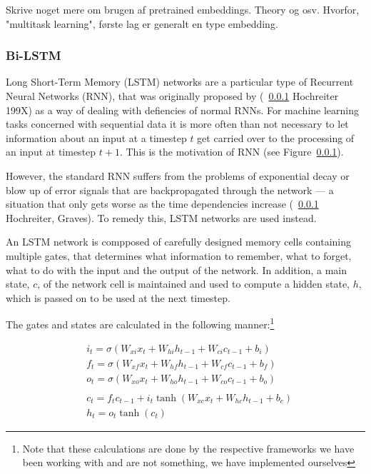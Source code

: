 Skrive noget mere om brugen af pretrained embeddings. Theory og osv.
Hvorfor, "multitask learning", første lag er generalt en type embedding.

\subsubsection{Bi-LSTM}

Long Short-Term Memory (LSTM) networks are a particular type of Recurrent Neural
Networks (RNN), that was originally proposed by (~\ref{} Hochreiter 199X) as a way of
dealing with defiencies of normal RNNs. For machine learning tasks concerned
with sequential data it is more often than not necessary to let information
about an input at a timestep $t$ get carried over to the processing of an input
at timestep $t+1$. This is the motivation of RNN (see Figure~\ref{}).

However, the standard RNN suffers from the problems of exponential decay or blow
up of error signals that are backpropagated through the network --- a situation
that only gets worse as the time dependencies increase (~\ref{} Hochreiter,
Graves). To remedy this, LSTM networks are used instead.

An LSTM network is compposed of carefully designed memory cells containing
multiple gates, that determines what information to remember, what to forget,
what to do with the input and the output of the network. In addition, a main
state, $c$, of the network cell is maintained and used to compute a hidden
state, $h$, which is passed on to be used at the next timestep.

The gates and states are calculated in the following manner:\footnote{Note that
    these calculations are done by the respective frameworks we have been
working with and are not something, we have implemented ourselves}

\begin{align*}
    & i_{t} = \sigma(W_{xi}x_{t} + W_{hi}h_{t-1} + W_{ci}c_{t-1} + b_{i})    \\
    & f_{t} = \sigma(W_{xf}x_{t} + W_{hf}h_{t-1} + W_{cf}c_{t-1} + b_{f})    \\
    & o_{t} = \sigma(W_{xo}x_{t} + W_{ho}h_{t-1} + W_{co}c_{t-1} + b_{o})    \\ \\
    & c_{t} = f_{t}c_{t-1} + i_{t}\tanh(W_{xc}x_{t} + W_{hc}h_{t-1} + b_{c}) \\
    & h_{t} = o_{t}\tanh(c_{t})
\end{align*}

